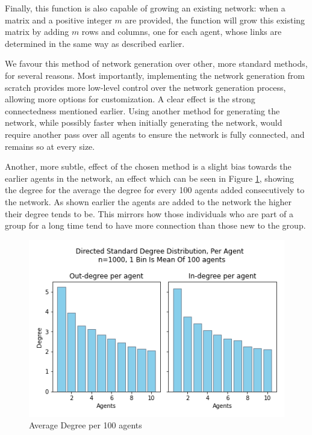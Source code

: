 \documentclass[a4paper, 12pt]{report}
\begin{document}
\noindent Finally, this function is also capable of growing an existing network: when a matrix and a positive integer $m$ are provided, the function will grow this existing matrix by adding $m$ rows and columns, one for each agent, whose links are determined in the same way as described earlier.

\noindent We favour this method of network generation over other, more standard methods, for several reasons. Most importantly, implementing the network generation from scratch provides more low-level control over the network generation process, allowing more options for customization. A clear effect is the strong connectedness mentioned earlier. Using another method for generating the network, while possibly faster when initially generating the network, would require another pass over all agents to ensure the network is fully connected, and remains so at every size. 

\newpage

\noindent Another, more subtle, effect of the chosen method is a slight bias towards the earlier agents in the network, an effect which can be seen in Figure \ref{degree:agent}, showing the degree for the average the degree for every 100 agents added consecutively to the network. As shown earlier the agents are added to the network the higher their degree tends to be. This mirrors how those individuals who are part of a group for a long time tend to have more connection than those new to the group.

\begin{center}
    \begin{figure}[!htbp]
        \centering
        \includegraphics[width=.8\textwidth]{ThesisKI/Images/DirectedStandardPerAgent.png}
        \caption{Average Degree per 100 agents}
        \label{degree:agent}
    \end{figure}
\end{center}
\newpage
\end{document}
